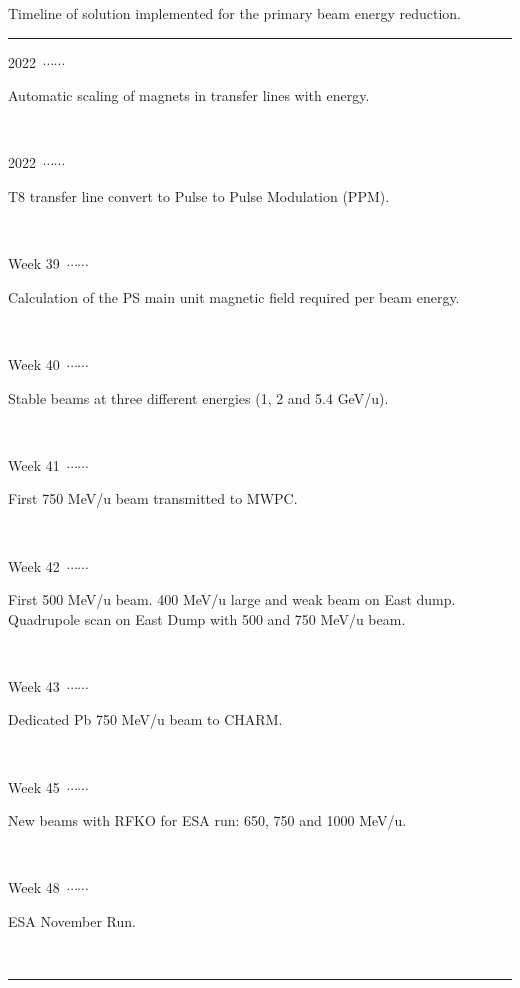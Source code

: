 \documentclass{cernatsnote}
\newcommand\ytl[2]{%
  \parbox[b]{8em}{\hfill{\color{black}#1}~$\cdots\cdots$~}%
  \makebox[0pt][c]{$\bullet$}\vrule\quad%
  \parbox[c]{8.5cm}{\vspace{7pt}\color{black}\raggedright #2.\\[7pt]}\\[-3pt]%
}
\begin{document}
\begin{table}[H]
\caption{Timeline of solution implemented for the primary beam energy reduction.}
\centering
\begin{minipage}[t]{.7\linewidth}
\color{gray}
\rule{\linewidth}{1pt}
\ytl{2022}{Automatic scaling of magnets in transfer lines with energy}
\ytl{2022}{T8 transfer line convert to Pulse to Pulse Modulation (PPM)}
\ytl{Week 39}{Calculation of the PS main unit magnetic field required per beam energy}
\ytl{Week 40}{Stable beams at three different energies (1, 2 and 5.4 GeV/u)}
\ytl{Week 41}{First 750 MeV/u beam transmitted to MWPC}
\ytl{Week 42}{First 500 MeV/u beam. 400 MeV/u large and weak beam on East dump. Quadrupole scan on East Dump with 500 and 750 MeV/u beam}
\ytl{Week 43}{Dedicated Pb 750 MeV/u beam to CHARM}
\ytl{Week 45}{New beams with RFKO for ESA run: 650, 750 and 1000 MeV/u}
\ytl{Week 48}{ESA November Run}
\bigskip
\rule{\linewidth}{1pt}%
\end{minipage}%
\end{table}



\end{document}
